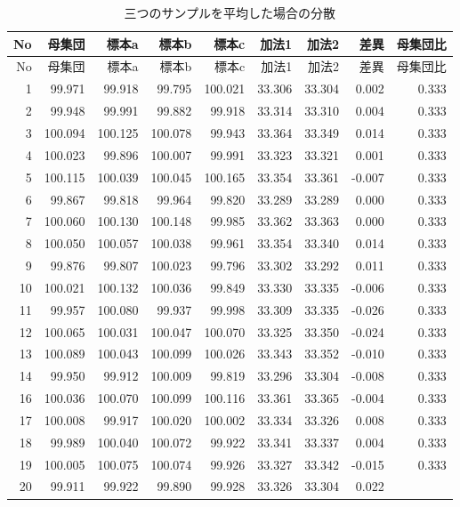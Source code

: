 \documentclass[]{tufte-handout}
\begin{document}
\begin{longtable}[]{@{}rrrrrrrrr@{}}
\caption{三つのサンプルを平均した場合の分散}\tabularnewline
\toprule
No & 母集団 & 標本a & 標本b & 標本c & 加法1 & 加法2 & 差異 & 母集団比 \\
\midrule
\endfirsthead
\toprule
No & 母集団 & 標本a & 標本b & 標本c & 加法1 & 加法2 & 差異 & 母集団比 \\
\midrule
\endhead
1 & 99.971 & 99.918 & 99.795 & 100.021 & 33.306 & 33.304 & 0.002 &
0.333 \\
2 & 99.948 & 99.991 & 99.882 & 99.918 & 33.314 & 33.310 & 0.004 &
0.333 \\
3 & 100.094 & 100.125 & 100.078 & 99.943 & 33.364 & 33.349 & 0.014 &
0.333 \\
4 & 100.023 & 99.896 & 100.007 & 99.991 & 33.323 & 33.321 & 0.001 &
0.333 \\
5 & 100.115 & 100.039 & 100.045 & 100.165 & 33.354 & 33.361 & -0.007 &
0.333 \\
6 & 99.867 & 99.818 & 99.964 & 99.820 & 33.289 & 33.289 & 0.000 &
0.333 \\
7 & 100.060 & 100.130 & 100.148 & 99.985 & 33.362 & 33.363 & 0.000 &
0.333 \\
8 & 100.050 & 100.057 & 100.038 & 99.961 & 33.354 & 33.340 & 0.014 &
0.333 \\
9 & 99.876 & 99.807 & 100.023 & 99.796 & 33.302 & 33.292 & 0.011 &
0.333 \\
10 & 100.021 & 100.132 & 100.036 & 99.849 & 33.330 & 33.335 & -0.006 &
0.333 \\
11 & 99.957 & 100.080 & 99.937 & 99.998 & 33.309 & 33.335 & -0.026 &
0.333 \\
12 & 100.065 & 100.031 & 100.047 & 100.070 & 33.325 & 33.350 & -0.024 &
0.333 \\
13 & 100.089 & 100.043 & 100.099 & 100.026 & 33.343 & 33.352 & -0.010 &
0.333 \\
14 & 99.950 & 99.912 & 100.009 & 99.819 & 33.296 & 33.304 & -0.008 &
0.333 \\
16 & 100.036 & 100.070 & 100.099 & 100.116 & 33.361 & 33.365 & -0.004 &
0.333 \\
17 & 100.008 & 99.917 & 100.020 & 100.002 & 33.334 & 33.326 & 0.008 &
0.333 \\
18 & 99.989 & 100.040 & 100.072 & 99.922 & 33.341 & 33.337 & 0.004 &
0.333 \\
19 & 100.005 & 100.075 & 100.074 & 99.926 & 33.327 & 33.342 & -0.015 &
0.333 \\
20 & 99.911 & 99.922 & 99.890 & 99.928 & 33.326 & 33.304 & 0.022 &

\end{longtable}
\end{document}
